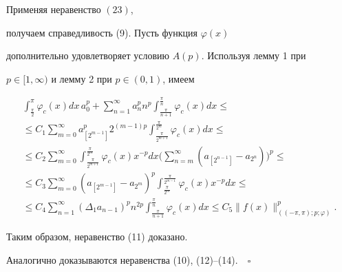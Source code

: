 Применяя неравенство $(23)$,


получаем справедливость (9). Пусть функция $\varphi (x)$


дополнительно удовлетворяет условию $A(p)$. Используя лемму 1 при


$p \in [1, \infty )$ и лемму 2 при $p \in (0,1)$, имеем


\begin{multline*}


\int_{\frac{\pi}{2}}^{\pi} \varphi_c(x)


dx\,a_0^p + \sum\limits_{n=1}^{\infty} a_n^p n^p


\int_{\frac{\pi}{n+1}}^{\frac{\pi}{n}}


\varphi_c(x) dx \le \\


%


\leq C_1 \sum\limits_{m=0}^{\infty} a_{[2^{m-1}]}^p 2^{(m-1)p}


\int_{\frac{\pi}{2^{m+1}}}^{\frac{\pi}{2^m}}


\varphi_c(x) dx \le \\


%


\leq C_2 \sum\limits_{m=0}^{\infty} \int_{\frac{\pi}


{2^{m+1}}}^{\frac{\pi}{2^m}}


\varphi_c(x) x^{-p} dx


\bigg( \sum\limits_{n=m}^{\infty} (a_{[2^{n-1}]} - a_{2^n})\bigg)^p \leq\\


%


\le C_3 \sum\limits_{m=0}^{\infty}


( a_{[2^{m-1}]} - a_{2^m})^p \int_{\frac{\pi}


{2^m}}^{\frac{\pi}{2^{m-1}}}


\varphi_c(x) x^{-p} dx \leq\\


%


\le C_4 \sum\limits_{n=1}^{\infty} ( \Delta_1 a_{n-1})^p n^{2p} 


\int_{\frac{\pi}{n+1}}^{\frac{\pi}{n}}


\varphi_c(x) dx \leq


C_5 \| f(x)\| ^p_{((-\pi,\pi);p;\varphi )}.


\end{multline*}


Таким образом, неравенство (11) доказано.


Аналогично доказываются неравенства (10), (12)--(14).$\quad\square$


